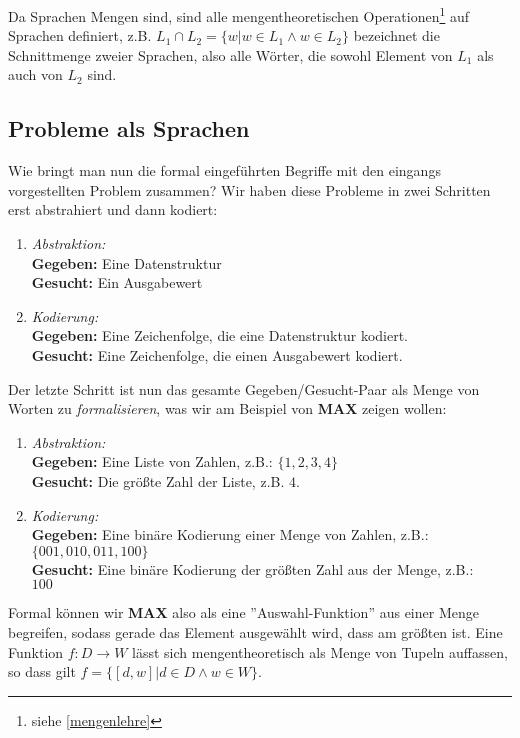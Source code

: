 \noindent
Da Sprachen Mengen sind,
sind alle mengentheoretischen Operationen\footnote{siehe \autoref{mengenlehre}}
auf Sprachen definiert,
z.B. $L_1 \cap L_2 = \{w | w \in L_1 \wedge w \in L_2\}$
bezeichnet die Schnittmenge zweier Sprachen, also alle Wörter,
die sowohl Element von $L_1$ als auch von $L_2$ sind.

\subsection{Probleme als Sprachen}
Wie bringt man nun die formal eingeführten Begriffe mit den eingangs vorgestellten Problem zusammen?
Wir haben diese Probleme in zwei Schritten erst abstrahiert und dann kodiert:
\begin{enumerate}
    \item \emph{Abstraktion:}
        \\\textbf{Gegeben:} Eine Datenstruktur
        \\\textbf{Gesucht:} Ein Ausgabewert
    \item \emph{Kodierung:}
        \\\textbf{Gegeben:} Eine Zeichenfolge, die eine Datenstruktur kodiert.
        \\\textbf{Gesucht:} Eine Zeichenfolge, die einen Ausgabewert kodiert.
\end{enumerate}
Der letzte Schritt ist nun das gesamte Gegeben/Gesucht-Paar
als Menge von Worten zu \emph{formalisieren},
was wir am Beispiel von \textbf{MAX} zeigen wollen:
\begin{enumerate}
    \item \emph{Abstraktion:}
        \\\textbf{Gegeben:} Eine Liste von Zahlen, z.B.: $\{1,2,3,4\}$
        \\\textbf{Gesucht:} Die größte Zahl der Liste, z.B. $4$.
    \item \emph{Kodierung:}
        \\\textbf{Gegeben:} Eine binäre Kodierung einer Menge von Zahlen, z.B.:
        \\$\{001, 010, 011, 100\}$
        \\\textbf{Gesucht:} Eine binäre Kodierung der größten Zahl aus der Menge, z.B.:
        \\$100$
\end{enumerate}

Formal können wir \textbf{MAX} also als eine ''Auswahl-Funktion'' aus einer Menge begreifen,
sodass gerade das Element ausgewählt wird, dass am größten ist.
Eine Funktion $f: D \rightarrow W$ lässt sich mengentheoretisch als Menge von Tupeln auffassen,
so dass gilt $f = \{[d,w]|d \in D \wedge w \in W\}$.

